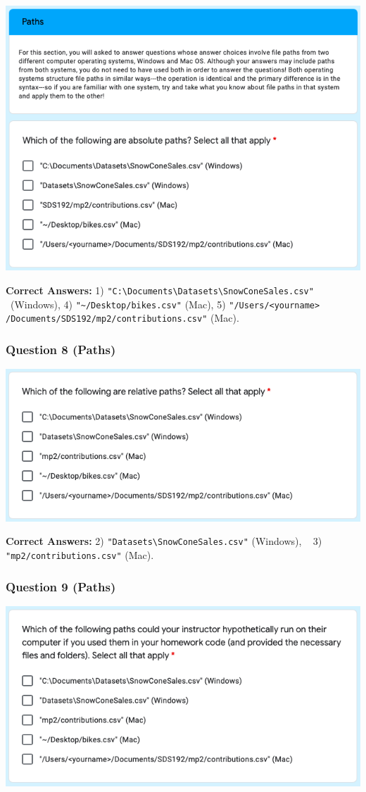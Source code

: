 \documentclass[12pt,twoside]{reedthesis}
\begin{document}
\includegraphics[width=0.8\linewidth]{figure/appendix/test-7}

\textbf{Correct Answers:} 1) \texttt{"C:\textbackslash{}Documents\textbackslash{}Datasets\textbackslash{}SnowConeSales.csv"} ~(Windows), 4) \texttt{"\textasciitilde{}/Desktop/bikes.csv"} (Mac), 5) \texttt{"/Users/\textless{}yourname\textgreater{}} ~
\texttt{/Documents/SDS192/mp2/contributions.csv"} (Mac).

\hypertarget{question-8-paths}{%
\subsubsection{Question 8 (Paths)}\label{question-8-paths}}

\includegraphics[width=0.8\linewidth]{figure/appendix/test-8}

\textbf{Correct Answers:} 2) \texttt{"Datasets\textbackslash{}SnowConeSales.csv"} (Windows), ~
3) \texttt{"mp2/contributions.csv"} (Mac).

\hypertarget{question-9-paths}{%
\subsubsection{Question 9 (Paths)}\label{question-9-paths}}

\includegraphics[width=0.8\linewidth]{figure/appendix/test-9}
\end{document}
